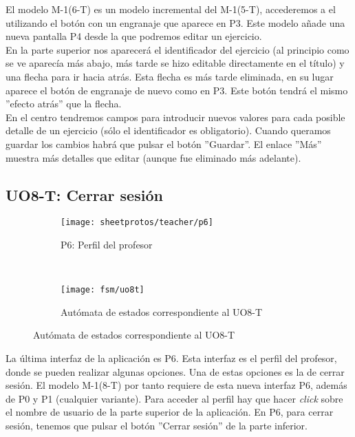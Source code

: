 El modelo M-1(6-T) es un modelo incremental del M-1(5-T), accederemos a el utilizando el botón con un engranaje que aparece en P3. Este modelo añade una nueva pantalla P4 desde la que podremos editar un ejercicio.\\

En la parte superior nos aparecerá el identificador del ejercicio (al principio como se ve aparecía más abajo, más tarde se hizo editable directamente en el título) y una flecha para ir hacia atrás. Esta flecha es más tarde eliminada, en su lugar aparece el botón de engranaje de nuevo como en P3. Este botón tendrá el mismo ''efecto atrás'' que la flecha.\\

En el centro tendremos campos para introducir nuevos valores para cada posible detalle de un ejercicio (sólo el identificador es obligatorio). Cuando queramos guardar los cambios habrá que pulsar el botón ''Guardar''. El enlace ''Más'' muestra más detalles que editar (aunque fue eliminado más adelante).\\

\subsection{UO8-T: Cerrar sesión}
\label{analisis-de-requisitos:funcionales:uo8t}

\begin{figure}[H]
\begin{subfigure}[b]{\textwidth}
	\centering
	\texttt{[image: sheetprotos/teacher/p6]}
	\caption{P6: Perfil del profesor}
	\label{fig:analisis-de-requisitos:funcionales:uo8t:p6}
\end{subfigure}
\\
\begin{subfigure}[b]{\textwidth}
	\centering
	\texttt{[image: fsm/uo8t]}
	\caption{Autómata de estados correspondiente al UO8-T}
	\label{fig:analisis-de-requisitos:funcionales:uo8t:fsm}
\end{subfigure}

\label{fig:analisis-de-requisitos:funcionales:uo8t}
\end{figure}

La última interfaz de la aplicación es P6. Esta interfaz es el perfil del profesor, donde se pueden realizar algunas opciones. Una de estas opciones es la de cerrar sesión. El modelo M-1(8-T) por tanto requiere de esta nueva interfaz P6, además de P0 y P1 (cualquier variante). Para acceder al perfil hay que hacer \textit{click} sobre el nombre de usuario de la parte superior de la aplicación. En P6, para cerrar sesión, tenemos que pulsar el botón ''Cerrar sesión'' de la parte inferior.\\

